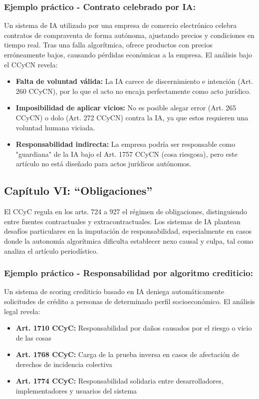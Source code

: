 \documentclass[10pt, a4paper]{article}
\begin{document}
\subsubsection*{Ejemplo práctico - Contrato celebrado por IA:}
Un sistema de IA utilizado por una empresa de comercio electrónico celebra contratos de compraventa de forma autónoma, ajustando precios y condiciones en tiempo real. Tras una falla algorítmica, ofrece productos con precios erróneamente bajos, causando pérdidas económicas a la empresa. El análisis bajo el CCyCN revela:
\begin{itemize}
    \item \textbf{Falta de voluntad válida:} La IA carece de discernimiento e intención (Art. 260 CCyCN), por lo que el acto no encaja perfectamente como acto jurídico.
    \item \textbf{Imposibilidad de aplicar vicios:} No es posible alegar error (Art. 265 CCyCN) o dolo (Art. 272 CCyCN) contra la IA, ya que estos requieren una voluntad humana viciada.
    \item \textbf{Responsabilidad indirecta:} La empresa podría ser responsable como "guardiana" de la IA bajo el Art. 1757 CCyCN (cosa riesgosa), pero este artículo no está diseñado para actos jurídicos autónomos.
\end{itemize}
\subsection{Capítulo VI: ``Obligaciones''}
\label{subsec:obligaciones}

El CCyC regula en los arts. 724 a 927 el régimen de obligaciones, distinguiendo entre fuentes contractuales y extracontractuales. Los sistemas de IA plantean desafíos particulares en la imputación de responsabilidad, especialmente en casos donde la autonomía algorítmica dificulta establecer nexo causal y culpa, tal como analiza el artículo periodístico.

\subsubsection*{Ejemplo práctico - Responsabilidad por algoritmo crediticio:}
Un sistema de scoring crediticio basado en IA deniega automáticamente solicitudes de crédito a personas de determinado perfil socioeconómico. El análisis legal revela:

\begin{itemize}
    \item \textbf{Art. 1710 CCyC:} Responsabilidad por daños causados por el riesgo o vicio de las cosas
    \item \textbf{Art. 1768 CCyC:} Carga de la prueba inversa en casos de afectación de derechos de incidencia colectiva
    \item \textbf{Art. 1774 CCyC:} Responsabilidad solidaria entre desarrolladores, implementadores y usuarios del sistema
\end{itemize}
\end{document}
